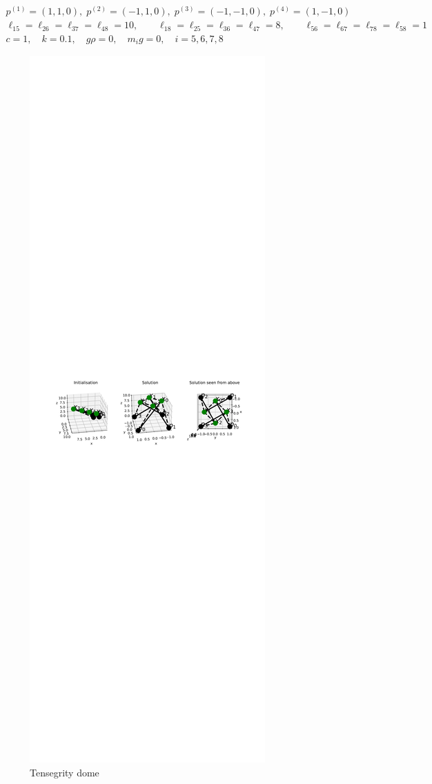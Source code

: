 \begin{equation*}
    \begin{gathered}
    p^{(1)} = (1,1,0),\; p^{(2)} = (-1,1,0),\; p^{(3)} = (-1,-1,0),\; p^{(4)} = (1,-1,0)\\
    \ell_{15} = \ell_{26} = \ell_{37} = \ell_{48} = 10, \qquad \ell_{18} = \ell_{25} = \ell_{36} = \ell_{47} = 8, \qquad \ell_{56} = \ell_{67} = \ell_{78} = \ell_{58} = 1\\
    c=1, \quad k= 0.1, \quad g \rho = 0,\quad m_i g = 0, \quad i = 5,6,7,8
    \end{gathered}
\end{equation*}

\begin{figure}
    \centering
    \includegraphics[width=0.6\columnwidth]{Bilder/P69.pdf}
    \caption{Tensegrity dome}
    \label{P69}
\end{figure}
